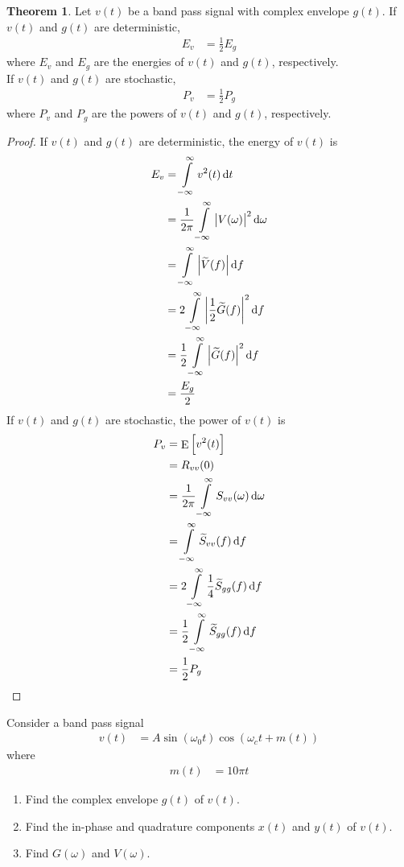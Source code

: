 \documentclass[titlepage, fleqn, a4paper, 12pt, twoside]{article}
\theoremstyle{definition}
\theoremstyle{theorem}
\newtheorem{theorem}{Theorem}
\renewcommand{\tilde}{\widetilde}
\DeclareMathOperator{\expct}{\mathrm{E}}
\begin{document}
\begin{theorem}
	Let $v(t)$ be a band pass signal with complex envelope $g(t)$.
	If $v(t)$ and $g(t)$ are deterministic,
	\begin{align*}
		E_v &= \frac{1}{2} E_g
	\end{align*}
	where $E_v$ and $E_g$ are the energies of $v(t)$ and $g(t)$, respectively.\\
	If $v(t)$ and $g(t)$ are stochastic,
	\begin{align*}
		P_v &= \frac{1}{2} P_g
	\end{align*}
	where $P_v$ and $P_g$ are the powers of $v(t)$ and $g(t)$, respectively.
\end{theorem}

\begin{proof}
	If $v(t)$ and $g(t)$ are deterministic, the energy of $v(t)$ is
	\begin{align*}
		E_v &= \int\limits_{-\infty}^{\infty} v^2(t) \dif t\\
		&= \frac{1}{2 \pi} \int\limits_{-\infty}^{\infty} \left| V(\omega) \right|^2 \dif \omega\\
		&= \int\limits_{-\infty}^{\infty} \left| \tilde{V}(f) \right| \dif f\\
		&= 2 \int\limits_{-\infty}^{\infty} \left| \frac{1}{2} \tilde{G}(f) \right|^2 \dif f\\
		&= \frac{1}{2} \int\limits_{-\infty}^{\infty} \left| \tilde{G}(f) \right|^2 \dif f\\
		&= \frac{E_g}{2}
	\end{align*}
	If $v(t)$ and $g(t)$ are stochastic, the power of $v(t)$ is
	\begin{align*}
		P_v &= \expct\left[ v^2(t) \right]\\
		&= R_{v v}(0)\\
		&= \frac{1}{2 \pi} \int\limits_{-\infty}^{\infty} S_{v v}(\omega) \dif \omega\\
		&= \int\limits_{-\infty}^{\infty} \tilde{S}_{v v}(f) \dif f\\
		&= 2 \int\limits_{-\infty}^{\infty} \frac{1}{4} \tilde{S}_{g g}(f) \dif f\\
		&= \frac{1}{2} \int\limits_{-\infty}^{\infty} \tilde{S}_{g g}(f) \dif f\\
		&= \frac{1}{2} P_g
	\end{align*}
\end{proof}

\begin{question}
	Consider a band pass signal
	\begin{align*}
		v(t) &= A \sin(\omega_0 t) \cos\left( \omega_c t +  m(t) \right)
	\end{align*}
	where
	\begin{align*}
		m(t) &= 10 \pi t
	\end{align*}
	\begin{enumerate}
		\item
			Find the complex envelope $g(t)$ of $v(t)$.
		\item
			Find the in-phase and quadrature components $x(t)$ and $y(t)$ of $v(t)$.
		\item
			Find $G(\omega)$ and $V(\omega)$.
	\end{enumerate}
\end{question}
\end{document}
